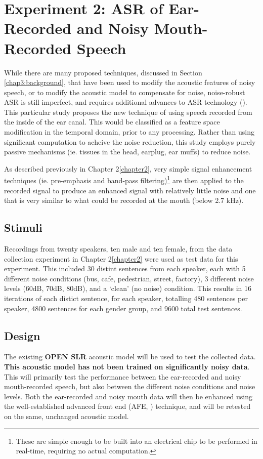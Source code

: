 \documentclass[dissertation,copyright]{uathesis}
\begin{document}
\section{Experiment 2: ASR of Ear-Recorded and Noisy Mouth-Recorded Speech}

While there are many proposed techniques, discussed in Section \ref{chap3:background}, that have been used to modify the acoustic features of noisy speech, or to modify the acoustic model to compensate for noise, noise-robust ASR is still imperfect, and requires additional advances to ASR technology (\cite{zhang:17}).  This particular study proposes the new technique of using speech recorded from the inside of the ear canal.  This would be classified as a feature space modification in the temporal domain, prior to any processing.  Rather than using significant computation to acheive the noise reduction, this study employs purely passive mechanisms (ie. tissues in the head, earplug, ear muffs) to reduce noise.  

As described previously in Chapter 2\ref{chapter2}, very simple signal enhancement techniques (ie. pre-emphasis and band-pass filtering)\footnote{These are simple enough to be built into an electrical chip to be performed in real-time, requiring no actual computation.} are then applied to the recorded signal to produce an enhanced signal with relatively little noise and one that is very similar to what could be recorded at the mouth (below 2.7 kHz).

\subsection{Stimuli}

Recordings from twenty speakers, ten male and ten female, from the data collection experiment in Chapter 2\ref{chapter2} were used as test data for this experiment.  This included 30 distint sentences from each speaker, each with 5 different noise conditions (bus, cafe, pedestrian, street, factory), 3 different noise levels (60dB, 70dB, 80dB), and a `clean' (no noise) condition.  This results in 16 iterations of each distict sentence, for each speaker, totalling 480 sentences per speaker, 4800 sentences for each gender group, and 9600 total test sentences.

\subsection{Design}

The existing \textbf{OPEN SLR} acoustic model will be used to test the collected data.  \textbf{This acoustic model has not been trained on significantly noisy data}.  This will primarily test the performance between the ear-recorded and noisy mouth-recorded speech, but also between the different noise conditions and noise levels.  Both the ear-recorded and noisy mouth data will then be enhanced using the well-established advanced front end (AFE, \cite{etsi:02}) technique, and will be retested on the same, unchanged acoustic model.
\end{document}
